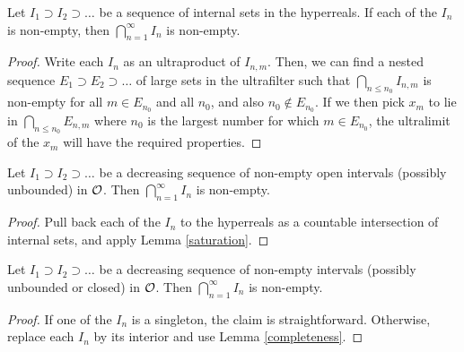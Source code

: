 \begin{lemma}\label{saturation}\leanok Let $I_1 \supset I_2 \supset \dots$ be a sequence of internal sets in the hyperreals.  If each of the $I_n$ is non-empty, then $\bigcap_{n=1}^\infty I_n$ is non-empty.
\end{lemma}

\begin{proof}  Write each $I_n$ as an ultraproduct of $I_{n,m}$.  Then, we can find a nested sequence $E_1 \supset E_2 \supset \dots$ of large sets in the ultrafilter such that $\bigcap_{n \leq n_0} I_{n,m}$ is non-empty for all $m \in E_{n_0}$ and all $n_0$, and also $n_0 \not \in E_{n_0}$.  If we then pick $x_m$ to lie in $\bigcap_{n \leq n_0} E_{n,m}$ where $n_0$ is the largest number for which $m \in E_{n_0}$, the ultralimit of the $x_m$ will have the required properties.
\end{proof}

\begin{lemma}[Completeness]\label{completeness} Let $I_1 \supset I_2 \supset \dots$ be a decreasing sequence of non-empty open intervals (possibly unbounded) in ${\mathcal O}$.  Then $\bigcap_{n=1}^\infty I_n$ is non-empty.
\end{lemma}

\begin{proof} Pull back each of the $I_n$ to the hyperreals as a countable intersection of internal sets, and apply Lemma \ref{saturation}.
\end{proof}

\begin{lemma}[Completeness, II]\label{completeness-2} Let $I_1 \supset I_2 \supset \dots$ be a decreasing sequence of non-empty intervals (possibly unbounded or closed) in ${\mathcal O}$.  Then $\bigcap_{n=1}^\infty I_n$ is non-empty.
\end{lemma}

\begin{proof}   If one of the $I_n$ is a singleton, the claim is straightforward.  Otherwise, replace each $I_n$ by its interior and use Lemma \ref{completeness}.
\end{proof}


